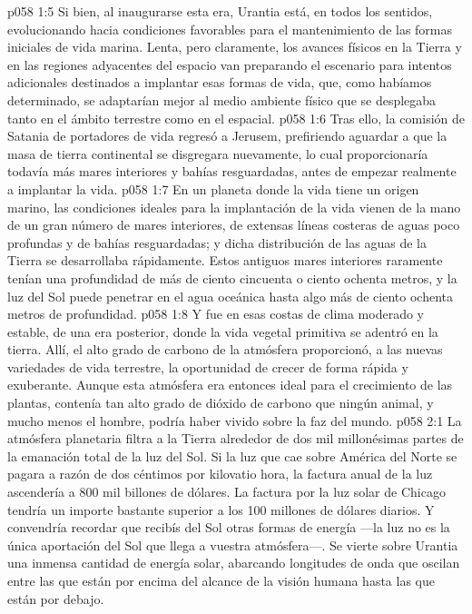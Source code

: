 \vs p058 1:5 Si bien, al inaugurarse esta era, Urantia está, en todos los sentidos, evolucionando hacia condiciones favorables para el mantenimiento de las formas iniciales de vida marina. Lenta, pero claramente, los avances físicos en la Tierra y en las regiones adyacentes del espacio van preparando el escenario para intentos adicionales destinados a implantar esas formas de vida, que, como habíamos determinado, se adaptarían mejor al medio ambiente físico que se desplegaba tanto en el ámbito terrestre como en el espacial.
\vs p058 1:6 Tras ello, la comisión de Satania de portadores de vida regresó a Jerusem, prefiriendo aguardar a que la masa de tierra continental se disgregara nuevamente, lo cual proporcionaría todavía más mares interiores y bahías resguardadas, antes de empezar realmente a implantar la vida.
\vs p058 1:7 \pc En un planeta donde la vida tiene un origen marino, las condiciones ideales para la implantación de la vida vienen de la mano de un gran número de mares interiores, de extensas líneas costeras de aguas poco profundas y de bahías resguardadas; y dicha distribución de las aguas de la Tierra se desarrollaba rápidamente. Estos antiguos mares interiores raramente tenían una profundidad de más de ciento cincuenta o ciento ochenta metros, y la luz del Sol puede penetrar en el agua oceánica hasta algo más de ciento ochenta metros de profundidad.
\vs p058 1:8 Y fue en esas costas de clima moderado y estable, de una era posterior, donde la vida vegetal primitiva se adentró en la tierra. Allí, el alto grado de carbono de la atmósfera proporcionó, a las nuevas variedades de vida terrestre, la oportunidad de crecer de forma rápida y exuberante. Aunque esta atmósfera era entonces ideal para el crecimiento de las plantas, contenía tan alto grado de dióxido de carbono que ningún animal, y mucho menos el hombre, podría haber vivido sobre la faz del mundo.
\vs p058 2:1 La atmósfera planetaria filtra a la Tierra alrededor de dos mil millonésimas partes de la emanación total de la luz del Sol. Si la luz que cae sobre América del Norte se pagara a razón de dos céntimos por kilovatio hora, la factura anual de la luz ascendería a 800 mil billones de dólares. La factura por la luz solar de Chicago tendría un importe bastante superior a los 100 millones de dólares diarios. Y convendría recordar que recibís del Sol otras formas de energía ---la luz no es la única aportación del Sol que llega a vuestra atmósfera---. Se vierte sobre Urantia una inmensa cantidad de energía solar, abarcando longitudes de onda que oscilan entre las que están por encima del alcance de la visión humana hasta las que están por debajo.
